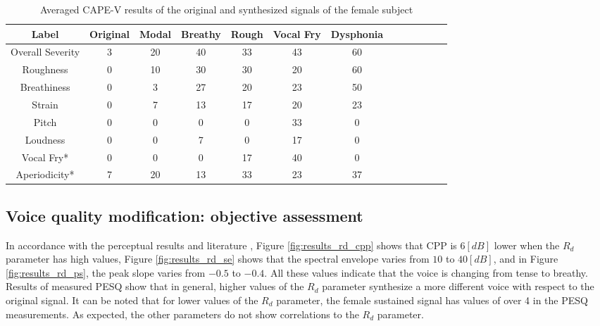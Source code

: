 \documentclass[final,5p,times,twocolumn]{elsarticle}
\begin{document}
\begin{table}[!htpb]
    \centering
    \begin{tabular}{ccccccccccccc}
        \hline \hline
        Label & Original & Modal & Breathy & Rough & Vocal Fry & Dysphonia\\ \hline
        Overall Severity & 3 & 20 & 40 & 33 & 43 & 60 \\
        Roughness        & 0 & 10 & 30 & 30 & 20 & 60\\
        Breathiness      & 0 & 3  & 27 & 20 & 23 & 50\\
        Strain           & 0 & 7  & 13 & 17 & 20 & 23\\
        Pitch            & 0 & 0  & 0  & 0  & 33 & 0 \\
        Loudness         & 0 & 0  & 7  & 0  & 17 & 0 \\
        Vocal Fry*       & 0 & 0  & 0  & 17 & 40 & 0 \\
        Aperiodicity*    & 7 & 20 & 13 & 33 & 23 & 37\\ \hline \hline
    \end{tabular}
    \caption{Averaged CAPE-V results of the original and synthesized signals of the female subject}
    \label{tab:percassfemale}
\end{table}

\subsection{Voice quality modification: objective assessment}

In accordance with the perceptual results and literature \cite{Fraile2014}\cite{HemanAckah2002}\cite{Kane_identifyingregions}\cite{Kreiman2014}, Figure \ref{fig:results_rd_cpp} shows that CPP is $6 [dB]$ lower when the $R_d$ parameter has high values, Figure \ref{fig:results_rd_se} shows that the spectral envelope varies from $10$ to $40 [dB]$, and in Figure \ref{fig:results_rd_ps}, the peak slope varies from $-0.5$ to $-0.4$. All these values indicate that the voice is changing from tense to breathy. Results of measured PESQ show that in general, higher values of the $R_d$ parameter synthesize a more different voice with respect to the original signal. It can be noted that for lower values of the $R_d$ parameter, the female sustained signal has values of over 4 in the PESQ measurements. As expected, the other parameters do not show correlations to the $R_d$ parameter.
\end{document}
